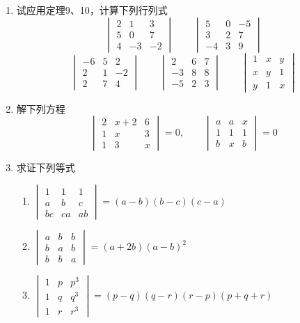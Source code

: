 \begin{ex}
\begin{enumerate}
    \item 试应用定理9、10，计算下列行列式
\[\begin{vmatrix}
2 & 1 & 3 \\
5 & 0 & 7 \\
4 & -3 & -2
\end{vmatrix}\qquad  \begin{vmatrix}
5 & 0 & -5 \\
3 & 2 & 7 \\
-4 & 3 & 9
\end{vmatrix} \]
\[\begin{vmatrix}
    -6 & 5 & 2 \\
    2 & 1 & -2 \\
    2 & 7 & 4
    \end{vmatrix}\qquad  \begin{vmatrix}
        2 & 6 & 7 \\
        -3 & 8 & 8 \\
        -5 & 2 & 3
        \end{vmatrix}\qquad  \begin{vmatrix}
            1 & x & y \\
            x & y & 1 \\
            y & 1 & x
            \end{vmatrix}\]
    \item 解下列方程
\[\begin{vmatrix}2 & x+2 & 6 \\ 1 & x & 3 \\ 1 & 3 & x\end{vmatrix}=0,\qquad \begin{vmatrix}a & a & x \\ 1 & 1 & 1 \\ b & x & b\end{vmatrix}=0\]
    \item 求证下列等式
\begin{enumerate}
    \item $\begin{vmatrix}1 & 1 & 1 \\ a & b & c \\ b c & c a & a b\end{vmatrix}=(a-b)(b-c)(c-a)$
    \item $\begin{vmatrix}
    a & b & b \\ b & a & b \\ b & b & a
\end{vmatrix}=(a+2 b)(a-b)^{2}$
\item $\begin{vmatrix}1 & p & p^{3} \\ 1 & q & q^{3} \\ 1 & r & r^{3}\end{vmatrix}=(p-q)(q-r)(r-p)(p+q+r)$
\end{enumerate}
\end{enumerate}
\end{ex}

